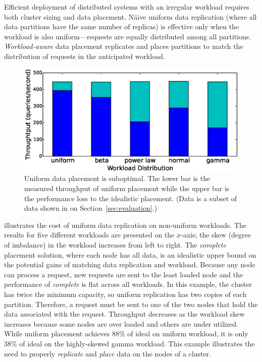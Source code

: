 Efficient deployment of distributed systems with an
irregular workload requires both cluster sizing and
data placement.
N\"aive uniform data replication (where all data partitions have the
same number of replicas) is effective only when the workload is also
uniform---requests are equally distributed among all partitions.
\emph{Workload-aware} data placement replicates and places
partitions to match the distribution of requests in the anticipated
workload.

\begin{figure}[!htbp]
    \centering
    \includegraphics[width=0.8\linewidth]{figures/E34_uniform_suboptimal_tp_stacked_scdm2017.eps}
    \caption{Uniform data placement is suboptimal.
             The lower bar is the measured throughput of uniform placement while
             the upper bar is the performance loss to the idealistic placement.
(Data is a subset of data shown in
\mytable{\ref{tab:throughput_comparison_local}} on Section~\ref{sec:evaluation}.)}
    \label{fig:uniform_suboptimal}
\end{figure}

\myfigure{\ref{fig:uniform_suboptimal}} illustrates the cost of
uniform data replication on non-uniform workloads.
The results for five different workloads are presented on the $x$-axis;
the skew (degree of imbalance) in the workload increases from
left to right.
The \emph{complete} placement solution, where each node has all data,
is an idealistic upper bound on the potential gains of
matching data replication and workload.
Because any node can process a request, new requests are sent to the
least loaded node and the performance of \emph{complete} is flat across all
workloads.
In this example, the cluster has twice the minimum capacity, so uniform
replication has two copies of each partition.
Therefore, a request must be sent to
one of the two nodes that hold the data associated
with the request.
Throughput decreases as the
workload skew increases because some nodes are over loaded and
others are under utilized.
While uniform placement achieves 88\% of ideal on uniform workload, it
is only 38\% of ideal on the highly-skewed gamma workload.
This example illustrates the need to properly \emph{replicate} and
\emph{place} data on the nodes of a cluster.


